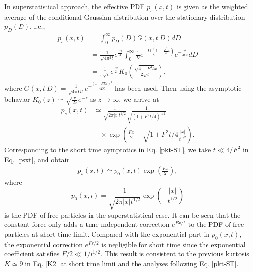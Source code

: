\documentclass[aps,pre,twocolumn,groupedaddress,longbibliography]{revtex4-2}
\begin{document}
In superstatistical approach, the effective PDF $p_s(x,t)$ is given as the weighted average of the conditional Gaussian distribution over the stationary distribution $p_D(D)$, i.e.,
\begin{equation}\label{short}
\begin{split}
p_s(x,t)&=\int_0^\infty p_D(D)G(x,t|D)dD  \\
&=\frac{1}{\sqrt{4\pi^2t}}e^{\frac{Fx}{2}}\int_0^\infty \frac{1}{D}e^{-D\left(1+\frac{F^2}{4}t\right)}e^{-\frac{x^2}{4Dt}}dD\\
&=\frac{1}{\pi\sqrt{t}}e^{\frac{Fx}{2}}K_0\left(\frac{\sqrt{4+F^2t}x}{2\sqrt{t}}\right),
\end{split}
\end{equation}
where  $G(x,t|D)=\frac{1}{\sqrt{4\pi Dt}}e^{-\frac{(x-FDt)^2}{4Dt}}$ has been used.
Then using the asymptotic behavior $K_0(z)\simeq \sqrt{\frac{\pi}{2z}}e^{-z}$ as $z\rightarrow\infty$, we arrive at
\begin{equation}\label{psxt}
\begin{split}
p_s(x,t)&\simeq \frac{1}{\sqrt{2\pi|x|t^{1/2}}}\frac{1}{\sqrt{(1+F^2t/4)^{1/2}}}  \\
&~~~~\times
\exp\left(\frac{Fx}{2}-\sqrt{1+F^2t/4}\frac{|x|}{t^{1/2}}\right).
\end{split}
\end{equation}
Corresponding to the short time aymptotics in Eq. \eqref{pkt-ST}, we take $t\ll 4/F^2$ in Eq. \eqref{psxt}, and obtain
\begin{equation}\label{psxt-ST}
\begin{split}
p_s(x,t)\simeq p_0(x,t) \exp\left(\frac{Fx}{2}\right),
\end{split}
\end{equation}
where
\begin{equation}\label{p0xt}
  p_0(x,t)=\frac{1}{\sqrt{2\pi|x|t^{1/2}}}\exp\left(-\frac{|x|}{t^{1/2}}\right)
\end{equation}
is the PDF of free particles in the superstatistical case. It can be seen that the constant force only adds a time-independent correction $e^{Fx/2}$ to the PDF of free particles at short time limit. Compared with the exponential part in $p_0(x,t)$, the exponential correction $e^{Fx/2}$ is negligible for short time since the exponential coefficient satisfies $F/2\ll 1/t^{1/2}$. This result is consistent to the previous kurtosis $K\simeq9$ in Eq. \eqref{K2} at short time limit and the analyses following Eq. \eqref{pkt-ST}.
\end{document}
